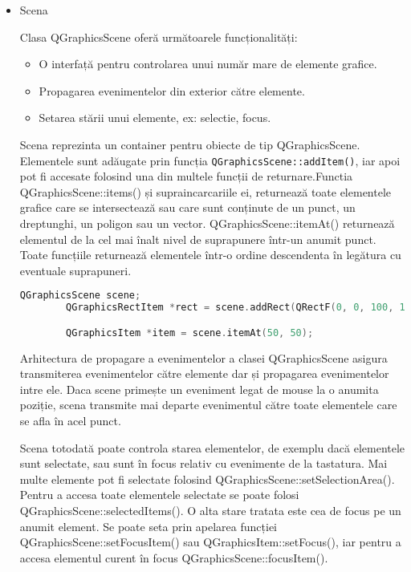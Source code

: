 \begin{itemize}
    \item Scena
    
    Clasa QGraphicsScene oferă următoarele funcționalități:
    \begin{itemize}
        \item O interfață pentru controlarea unui număr mare de elemente grafice.
        \item Propagarea evenimentelor din exterior către elemente.
        \item Setarea stării unui elemente, ex: selectie, focus.
    \end{itemize}

    Scena reprezinta un container pentru obiecte de tip QGraphicsScene. Elementele sunt adăugate prin funcția 
    \verb|QGraphicsScene::addItem()|, iar apoi pot fi accesate folosind una din multele funcții de returnare.Functia 
    QGraphicsScene::items() și supraincarcariile ei, returnează toate elementele grafice care se intersectează sau 
    care sunt conținute de un punct, un dreptunghi, un poligon sau un vector. QGraphicsScene::itemAt() returnează elementul 
    de la cel mai înalt nivel de suprapunere într-un anumit punct. Toate funcțiile returnează elementele într-o ordine 
    descendenta în legătura cu eventuale suprapuneri.\newline

    \begin{lstlisting}[language=C++]
        QGraphicsScene scene;
        QGraphicsRectItem *rect = scene.addRect(QRectF(0, 0, 100, 100));

        QGraphicsItem *item = scene.itemAt(50, 50);
    \end{lstlisting}

    Arhitectura de propagare a evenimentelor a clasei QGraphicsScene asigura transmiterea evenimentelor către 
    elemente dar și propagarea evenimentelor intre ele. Daca scene primește un eveniment legat de mouse la o anumita poziție, 
    scena transmite mai departe evenimentul către toate elementele care se afla în acel punct.\newline

    Scena totodată poate controla starea elementelor, de exemplu dacă elementele sunt selectate, sau sunt în focus relativ cu 
    evenimente de la tastatura. Mai multe elemente pot fi selectate folosind QGraphicsScene::setSelectionArea(). 
    Pentru a accesa toate elementele selectate se poate folosi QGraphicsScene::selectedItems(). O alta stare tratata este cea 
    de focus pe un anumit element. Se poate seta prin apelarea funcției QGraphicsScene::setFocusItem() sau QGraphicsItem::setFocus(), 
    iar pentru a accesa elementul curent în focus QGraphicsScene::focusItem().\newline


\end{itemize}
